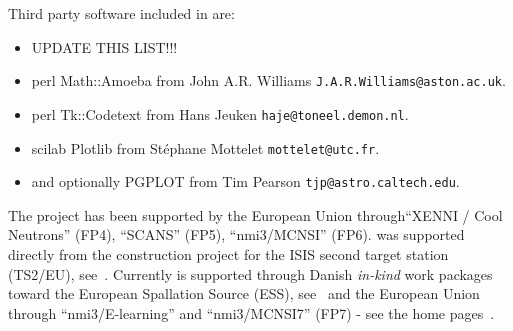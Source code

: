 Third party software included in \MCS are:
\begin{itemize}
\item UPDATE THIS LIST!!!
\item perl Math::Amoeba from John A.R. Williams \verb+J.A.R.Williams@aston.ac.uk+.
\item perl Tk::Codetext from Hans Jeuken \verb+haje@toneel.demon.nl+.
\item scilab Plotlib from St\'ephane Mottelet \verb+mottelet@utc.fr+.
\item and optionally PGPLOT from Tim Pearson \verb+tjp@astro.caltech.edu+.
\end{itemize}

The \MCS project has been supported by the European Union
through``XENNI / Cool Neutrons'' (FP4), ``SCANS'' (FP5),
``nmi3/MCNSI'' (FP6). \MCS was supported directly from the construction project for the ISIS second
target station (TS2/EU), see~\cite{ts2_webpage}. Currently \MCS is 
supported through Danish \emph{in-kind} work packages toward the
European Spallation Source (ESS), see~\cite{ess_webpage} and the
European Union through ``nmi3/E-learning'' and ``nmi3/MCNSI7'' (FP7) - see
the home pages~\cite{nmi3_webpage,mcnsi_webpage}.

